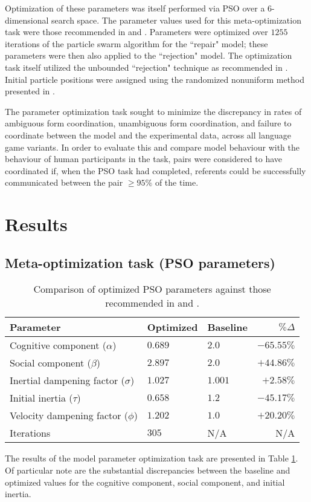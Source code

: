 \documentclass[12pt,a4paper]{article}
\begin{document}
Optimization of these parameters was itself performed via PSO over a $6$-dimensional search space. The parameter values used for this meta-optimization task were those recommended in \cite{shi1998} and \cite{solnon2010}. Parameters were optimized over $1255$ iterations of the particle swarm algorithm for the ``repair" model; these parameters were then also applied to the ``rejection" model. The optimization task itself utilized the unbounded ``rejection" technique as recommended in \cite{engelbrecht2005}. Initial particle positions were assigned using the randomized nonuniform method presented in \cite{mitchell1991}.

The parameter optimization task sought to minimize the discrepancy in rates of ambiguous form coordination, unambiguous form coordination, and failure to coordinate between the model and the experimental data, across all language game variants. In order to evaluate this and compare model behaviour with the behaviour of human participants in the task, pairs were considered to have coordinated if, when the PSO task had completed, referents could be successfully communicated between the pair $\geq 95\%$ of the time.


\section{Results}
\subsection{Meta-optimization task (PSO parameters)}
\label{sec:parameter_optimization}
\begin{table}[b]
\begin{center}
    \begin{tabular}{ l l l r }
    Parameter & Optimized & Baseline & $\% \Delta$ \\ \hline
    Cognitive component ($\alpha$)       & $0.689$ & $2.0$   & $-65.55\%$ \\ \hline
    Social component ($\beta$)           & $2.897$ & $2.0$   & $+44.86\%$ \\ \hline
    Inertial dampening factor ($\sigma$) & $1.027$ & $1.001$ & $+2.58\%$\\ \hline
    Initial inertia ($\tau$)             & $0.658$ & $1.2$   & $-45.17\%$ \\ \hline
    Velocity dampening factor ($\phi$)   & $1.202$ & $1.0$   & $+20.20\%$\\ \hline
    Iterations                           & $305$   & N/A     & N/A\\ 
    \end{tabular}
   	\caption{Comparison of optimized PSO parameters against those recommended in \cite{shi1998} and \cite{solnon2010}.}
	\label{table:1}
\end{center}
\end{table}
The results of the model parameter optimization task are presented in Table \ref{table:1}. Of particular note are the substantial discrepancies between the baseline and optimized values for the cognitive component, social component, and initial inertia.
\end{document}
